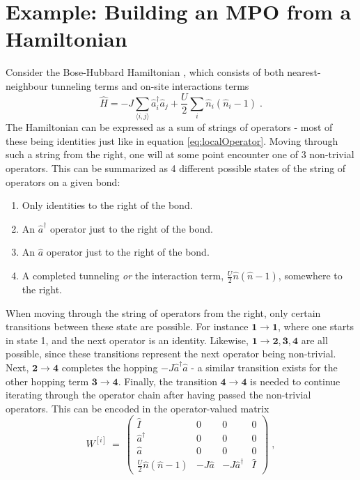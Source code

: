 \chapter{Example: Building an MPO from a Hamiltonian}
\label{chap:buildMPO}
Consider the Bose-Hubbard Hamiltonian , which consists of both nearest-neighbour tunneling terms and on-site interactions terms
\begin{equation}
	\hat{H} = - J \sum_{\langle i,j \rangle} \hat{a}_{i}^{\dag} \hat{a}_{j} + \frac{U}{2} \sum_{i} \hat{n}_i \left( \hat{n}_i -1 \right) \; .
	\label{eq:BHhamil}
\end{equation}
The Hamiltonian can be expressed as a sum of strings of operators - most of these being identities just like in equation \ref{eq:localOperator}. Moving through such a string from the right, one will at some point encounter one of 3 non-trivial operators. This can be summarized as 4 different possible states of the string of operators on a given bond:
\begin{enumerate}
	\item
	Only identities to the right of the bond.
	\item
	An $\hat{a}^{\dag}$ operator just to the right of the bond.
	\item
	An $\hat{a}$ operator just to the right of the bond.
	\item
	A completed tunneling \textit{or} the interaction term, $\frac{U}{2} \hat{n} \left( \hat{n} -1 \right)$, somewhere to the right.
\end{enumerate}
When moving through the string of operators from the right, only certain transitions between these state are possible. For instance $\boldsymbol{1 \rightarrow 1}$, where one starts in state 1, and the next operator is an identity. Likewise, $\boldsymbol{1 \rightarrow 2,3,4}$ are all possible, since these transitions represent the next operator being non-trivial. Next, $\boldsymbol{2 \rightarrow 4}$ completes the hopping $-J \hat{a}^{\dag} \hat{a}$ - a similar transition exists for the other hopping term $\boldsymbol{3 \rightarrow 4}$. Finally, the transition $\boldsymbol{4 \rightarrow 4}$ is needed to continue iterating through the operator chain after having passed the non-trivial operators. This can be encoded in the operator-valued matrix
\begin{equation}
 W^{[i]} \: = \: \begin{pmatrix}
\hat{I} & 0 & 0 & 0  \\
\hat{a}^{\dag} & 0 & 0 & 0  \\
\hat{a} & 0 & 0 & 0 \\
\frac{U}{2} \hat{n} \left( \hat{n} -1 \right) & -J \hat{a} & -J \hat{a}^{\dag} &  \hat{I}
\end{pmatrix} \; ,
\label{eq:MPOmatrix}
\end{equation}
